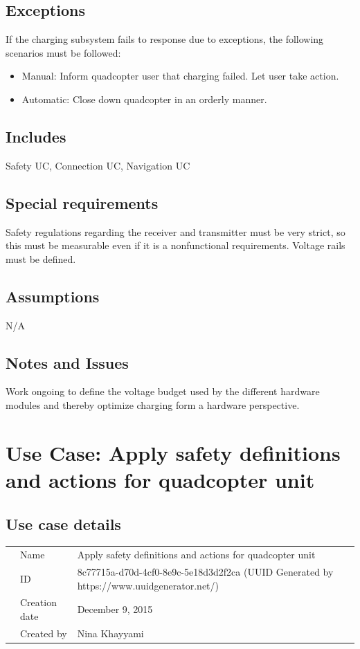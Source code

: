 \documentclass[a4paper]{article}
\begin{document}
\subsection{Exceptions}
If the charging subsystem fails to response due to exceptions, the following scenarios must be followed:
\begin{itemize}
	\item Manual: Inform quadcopter user that charging failed. Let user take action.
	\item Automatic: Close down quadcopter in an orderly manner.
\end{itemize}
\subsection{Includes}
Safety UC, Connection UC, Navigation UC
\subsection{Special requirements}
Safety regulations regarding the receiver and transmitter must be very strict, so this must be measurable even if it is  a nonfunctional requirements. Voltage rails must be defined.
\subsection{Assumptions}
N/A
\subsection{Notes and Issues}
Work ongoing to define the voltage budget used by the different hardware modules and thereby optimize charging form a hardware perspective.

\section{Use Case: Apply safety definitions and actions for quadcopter unit}
\subsection{Use case details}

\begin{tabular}{lll}
	&Name  & Apply safety definitions and actions for quadcopter unit\\
	&ID  & 8c77715a-d70d-4cf0-8e9c-5e18d3d2f2ca (UUID Generated by https://www.uuidgenerator.net/)  \\
	&Creation date  & December 9, 2015\\
	&Created by  & Nina Khayyami
\end{tabular}
\end{document}

